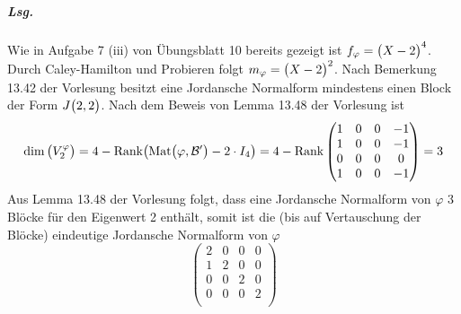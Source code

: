 \documentclass{scrreprt}
\newcommand{\Mat}{\text{Mat}}
\newcommand{\Rank}{\text{Rank}}
\begin{document}
\begin{enumerate}[(i)]
  \subparagraph{Lsg.} Wie in Aufgabe 7 (iii) von Übungsblatt 10 bereits
  gezeigt ist $f_{\varphi} = \qty\big(X - 2)^4$.
  Durch Caley-Hamilton und Probieren folgt $m_{\varphi} = \qty\big(X - 2)^2$.
  Nach Bemerkung 13.42 der Vorlesung besitzt eine Jordansche Normalform
  mindestens einen Block der Form $J\qty\big(2, 2)$.
  Nach dem Beweis von Lemma 13.48 der Vorlesung ist
  \[
    \dim\qty\big(V_2^{\varphi}) =
    4 - \Rank\qty\big(\Mat\qty\big(\varphi, \mathcal{B}') - 2 \cdot I_4)
    = 4 - \Rank\begin{pmatrix}
      1 & 0 & 0 & -1 \\
      1 & 0 & 0 & -1 \\
      0 & 0 & 0 &  0 \\
      1 & 0 & 0 & -1 \\
    \end{pmatrix} = 3
  \]
  Aus Lemma 13.48 der Vorlesung folgt, dass eine Jordansche Normalform
  von $\varphi$ 3 Blöcke für den Eigenwert 2 enthält, somit ist die
  (bis auf Vertauschung der Blöcke) eindeutige Jordansche Normalform von
  $\varphi$
  \[
    \begin{pmatrix}
      2 & 0 & 0 & 0 \\
      1 & 2 & 0 & 0 \\
      0 & 0 & 2 & 0 \\
      0 & 0 & 0 & 2 \\
    \end{pmatrix}
  \]
\end{enumerate}
\end{document}
